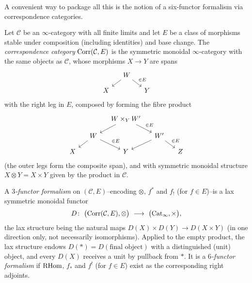 A convenient way to package all this is the notion of a six-functor formalism
via correspondence categories.

\begin{definition}
\label{def:21:correspondence}
Let $\mathcal C$ be an $\infty$-category with all finite limits and let
$E$ be a class of morphisms stable under composition (including identities) and
base change. The \emph{correspondence category} $\operatorname{Corr}(\mathcal C,E)$ is the
symmetric monoidal $\infty$-category with the same objects as $\mathcal C$,
whose morphisms $X\to Y$ are spans
\begin{equation*}
\begin{tikzcd}[column sep=small, row sep=small]
& W \arrow[dl] \arrow[dr, "\in E"] & \\
X & & Y
\end{tikzcd}
\end{equation*}
with the right leg in $E$, composed by forming the fibre product
\begin{equation*}
\begin{tikzcd}[column sep=small, row sep=small]
& & W\times_Y W' \arrow[dl] \arrow[dr, "\in E"] & & \\
& W \arrow[dl] \arrow[dr, "\in E"] & & W' \arrow[dl] \arrow[dr, "\in E"] & \\
X & & Y & & Z
\end{tikzcd}
\end{equation*}
(the outer legs form the composite span), and with symmetric monoidal structure
$X\otimes Y=X\times Y$ given by the product in $\mathcal C$.
\end{definition}

\begin{definition}
\label{def:21:functor-formalism}
A \emph{$3$-functor formalism} on $(\mathcal C,E)$--encoding $\otimes$, $f^{*}$
and $f_{!}$ (for $f\in E$)--is a lax symmetric monoidal functor
\begin{equation*}
D\colon\ \bigl(\Corr(\mathcal C,E),\otimes\bigr)\ \longrightarrow\
\bigl(\Catinf,\times\bigr),
\end{equation*}
the lax structure being the natural maps
$D(X)\times D(Y)\to D(X\times Y)$ (in one direction only, not necessarily
isomorphisms). Applied to the empty product, the lax structure endows
$D(\ast)=D(\text{final object})$ with a distinguished (unit) object, and every
$D(X)$ receives a unit by pullback from $\ast$. It is a \emph{$6$-functor
formalism} if $\mathrm{RHom}$, $f_{*}$ and $f^{!}$ (for $f\in E$) exist as the
corresponding right adjoints.
\end{definition}


